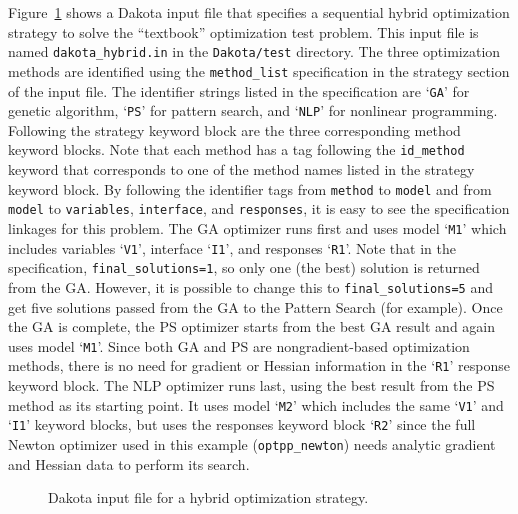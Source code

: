 

Figure~\ref{strat:figure01} shows a Dakota input file that specifies
a sequential hybrid optimization strategy to solve the
``textbook'' optimization test problem. This input file is named
\texttt{dakota\_hybrid.in} in the \texttt{Dakota/test} directory.
The three optimization methods are identified using the
\texttt{method\_list} specification in the strategy section of the
input file. The identifier strings listed in the specification are
`\texttt{GA}' for genetic algorithm, `\texttt{PS}' for pattern search,
and `\texttt{NLP}' for nonlinear programming. Following the strategy
keyword block are the three corresponding method keyword blocks. Note
that each method has a tag following the \texttt{id\_method} keyword
that corresponds to one of the method names listed in the strategy
keyword block. By following the identifier tags from \texttt{method}
to \texttt{model} and from \texttt{model} to \texttt{variables},
\texttt{interface}, and \texttt{responses}, it is easy to see the
specification linkages for this problem. The GA optimizer runs first
and uses model `\texttt{M1}' which includes variables `\texttt{V1}',
interface `\texttt{I1}', and responses `\texttt{R1}'. 
Note that in the specification, \texttt{final\_solutions=1}, 
so only one (the best) solution is returned from the GA.  
However, it is possible to change this to \texttt{final\_solutions=5}
and get five solutions passed from the GA to the Pattern Search
(for example).  Once the GA is complete, the PS optimizer starts from the 
best GA result and again
uses model `\texttt{M1}'. Since both GA and PS are nongradient-based
optimization methods, there is no need for gradient or Hessian
information in the `\texttt{R1}' response keyword block. The NLP
optimizer runs last, using the best result from the PS method as its
starting point.  It uses model `\texttt{M2}' which includes the same
`\texttt{V1}' and `\texttt{I1}' keyword blocks, but uses the responses
keyword block `\texttt{R2}' since the full Newton optimizer used in
this example (\texttt{optpp\_newton}) needs analytic gradient and
Hessian data to perform its search.
\begin{figure}
  \centering
  \begin{bigbox}
    \begin{tiny}
    \end{tiny}
  \end{bigbox}
  \caption{Dakota input file for a hybrid optimization strategy.}
  \label{strat:figure01}
\end{figure}

